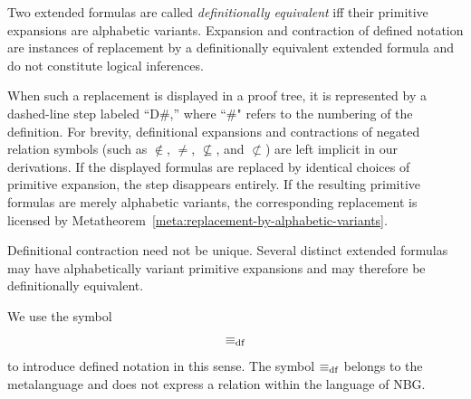 Two extended formulas are called \emph{definitionally equivalent} iff their
primitive expansions are alphabetic variants. Expansion and contraction of
defined notation are instances of replacement by a definitionally
equivalent extended formula and do not constitute logical inferences.

When such a replacement is displayed in a proof tree, it is represented by a dashed-line step labeled ``D\#,'' where ``\#" refers to the numbering of the definition. For brevity, definitional expansions and contractions of negated relation symbols (such as \(\notin\), \(\neq\), \(\nsubseteq\), and \(\not\subset\)) are left implicit in our derivations. If the displayed formulas are replaced by identical choices of primitive expansion, the step disappears entirely. If the resulting primitive formulas are merely alphabetic variants, the corresponding replacement is licensed by Metatheorem~\ref{meta:replacement-by-alphabetic-variants}.

Definitional contraction need not be unique. Several distinct extended
formulas may have alphabetically variant primitive expansions and may
therefore be definitionally equivalent.

We use the symbol
\[
\mathrel{\equiv_{\mathrm{df}}}
\]
to introduce defined notation in this sense. The symbol
\(\mathrel{\equiv_{\mathrm{df}}}\) belongs to the metalanguage and does not express a relation
within the language of NBG. 